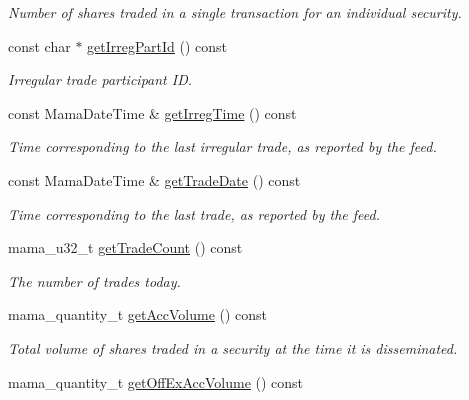\begin{CompactItemize}
\begin{CompactList}\small\item\em Number of shares traded in a single transaction for an individual security. \item\end{CompactList}\item 
const char $\ast$ \hyperlink{classWombat_1_1MamdaTradeListener_a8ee06db46d55e03adf400ade37b18e1}{get\-Irreg\-Part\-Id} () const 
\begin{CompactList}\small\item\em Irregular trade participant ID. \item\end{CompactList}\item 
const Mama\-Date\-Time \& \hyperlink{classWombat_1_1MamdaTradeListener_a8b74cc931fd2f5453ad7f393145402e}{get\-Irreg\-Time} () const 
\begin{CompactList}\small\item\em Time corresponding to the last irregular trade, as reported by the feed. \item\end{CompactList}\item 
const Mama\-Date\-Time \& \hyperlink{classWombat_1_1MamdaTradeListener_078b15ccd771aae1890bf26e0471c0a6}{get\-Trade\-Date} () const 
\begin{CompactList}\small\item\em Time corresponding to the last trade, as reported by the feed. \item\end{CompactList}\item 
mama\_\-u32\_\-t \hyperlink{classWombat_1_1MamdaTradeListener_09698082a48276bf7d67a160bdff61b7}{get\-Trade\-Count} () const 
\begin{CompactList}\small\item\em The number of trades today. \item\end{CompactList}\item 
mama\_\-quantity\_\-t \hyperlink{classWombat_1_1MamdaTradeListener_7636476d5939f0128bf0a7fba1960cd6}{get\-Acc\-Volume} () const 
\begin{CompactList}\small\item\em Total volume of shares traded in a security at the time it is disseminated. \item\end{CompactList}\item 
mama\_\-quantity\_\-t \hyperlink{classWombat_1_1MamdaTradeListener_e4a1bd8bfd6143e85e08ebd98fa8b8c1}{get\-Off\-Ex\-Acc\-Volume} () const 

\end{CompactItemize}
